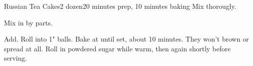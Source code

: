 \documentclass[../Cookbook.tex]{subfiles}
\begin{document}
\begin{recipe}[RussianTeaCakes]{Russian Tea Cakes}{2 dozen}{20 minutes prep, 10 minutes baking}
Mix thorougly.

Mix in by parts.

Add.
Roll into 1" balls.
Bake at  until set, about 10 minutes.
They won't brown or spread at all.
Roll in powdered sugar while warm, then again shortly before serving.

\end{recipe}
\end{document}

